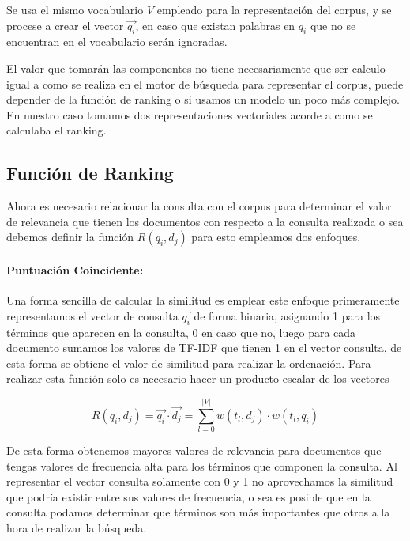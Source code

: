 \documentclass[runningheads,a4paper]{llncs}
\begin{document}
Se usa el mismo vocabulario $V$ empleado para la representación del corpus, y se procese a crear el vector $\overrightarrow{q_i}$, en caso que existan palabras en $q_i$ que no se encuentran en el vocabulario serán ignoradas. 

El valor que tomarán las componentes no tiene necesariamente que ser calculo igual a como se realiza en el motor de búsqueda para representar el corpus, puede depender de la función de ranking o si usamos un modelo un poco más complejo. En nuestro caso tomamos dos representaciones vectoriales acorde a como se calculaba el ranking.

\subsection*{Función de Ranking} 

Ahora es necesario relacionar la consulta con el corpus para determinar el valor de relevancia que tienen los documentos con respecto a la consulta realizada o sea debemos definir la función $R(q_i, d_j)$ para esto empleamos dos enfoques.

\paragraph{Puntuación Coincidente:} Una forma sencilla de calcular la similitud es emplear este enfoque primeramente representamos el vector de consulta $\overrightarrow{q_i}$ de forma binaria, asignando 1 para los términos que aparecen en la consulta, 0 en caso que no, luego para cada documento sumamos los valores de TF-IDF que tienen 1 en el vector consulta, de esta forma se obtiene el valor de similitud para realizar la ordenación.
Para realizar esta función solo es necesario hacer un producto escalar de los vectores

\begin{equation}
	R(q_i, d_j) = \overrightarrow{q_i} \cdot \overrightarrow{d_j} = \sum_{l = 0}^{|V|} w(t_l, d_j) \cdot w(t_l, q_i)
\end{equation}

De esta forma obtenemos mayores valores de relevancia para documentos que tengas valores de frecuencia alta para los términos que componen la consulta. Al representar el vector consulta solamente con 0 y 1 no aprovechamos la similitud que podría existir entre sus valores de frecuencia, o sea es posible que en la consulta podamos determinar que términos son más importantes que otros a la hora de realizar la búsqueda. 
\end{document}
